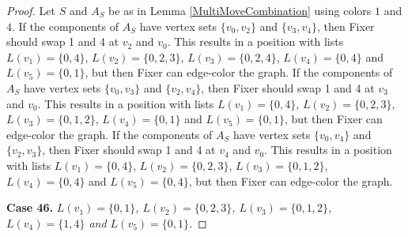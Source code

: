 \documentclass[12pt]{amsart}
\theoremstyle{plain}
\theoremstyle{definition}
\theoremstyle{remark}
\begin{document}
\begin{proof}
Let $S$ and $A_S$ be as in Lemma \ref{MultiMoveCombination} using colors $1$ and $4$. If the components of $A_S$ have vertex sets $\{v_0, v_2\}$ and $\{v_3, v_4\}$, then Fixer should swap 1 and 4 at $v_2$ and $v_0$. This results in a position with lists $L(v_1) = \{0, 4\}$, $L(v_2) = \{0, 2, 3\}$, $L(v_3) = \{0, 2, 4\}$, $L(v_4) = \{0, 4\}$ and $L(v_5) = \{0, 1\}$, but then Fixer can edge-color the graph.
If the components of $A_S$ have vertex sets $\{v_0, v_3\}$ and $\{v_2, v_4\}$, then Fixer should swap 1 and 4 at $v_3$ and $v_0$. This results in a position with lists $L(v_1) = \{0, 4\}$, $L(v_2) = \{0, 2, 3\}$, $L(v_3) = \{0, 1, 2\}$, $L(v_4) = \{0, 1\}$ and $L(v_5) = \{0, 1\}$, but then Fixer can edge-color the graph.
If the components of $A_S$ have vertex sets $\{v_0, v_4\}$ and $\{v_2, v_3\}$, then Fixer should swap 1 and 4 at $v_4$ and $v_0$. This results in a position with lists $L(v_1) = \{0, 4\}$, $L(v_2) = \{0, 2, 3\}$, $L(v_3) = \{0, 1, 2\}$, $L(v_4) = \{0, 4\}$ and $L(v_5) = \{0, 4\}$, but then Fixer can edge-color the graph.

\noindent\textbf{Case 46.  }\textit{$L(v_1) = \{0, 1\}$, $L(v_2) = \{0, 2, 3\}$, $L(v_3) = \{0, 1, 2\}$, $L(v_4) = \{1, 4\}$ and $L(v_5) = \{0, 1\}$.}


\end{proof}
\end{document}
